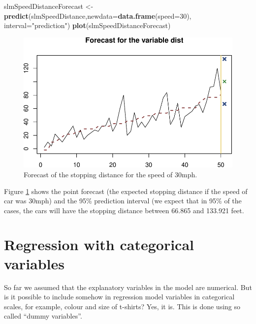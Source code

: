 \documentclass[
]{book}
\newenvironment{Shaded}{\begin{snugshade}}{\end{snugshade}}
\newcommand{\DataTypeTok}[1]{\textcolor[rgb]{0.13,0.29,0.53}{#1}}
\newcommand{\DecValTok}[1]{\textcolor[rgb]{0.00,0.00,0.81}{#1}}
\newcommand{\KeywordTok}[1]{\textcolor[rgb]{0.13,0.29,0.53}{\textbf{#1}}}
\newcommand{\NormalTok}[1]{#1}
\newcommand{\StringTok}[1]{\textcolor[rgb]{0.31,0.60,0.02}{#1}}
\theoremstyle{definition}
\theoremstyle{definition}
\theoremstyle{definition}
\theoremstyle{definition}
\theoremstyle{remark}
\begin{document}
\begin{Shaded}
\begin{Highlighting}[]
\NormalTok{slmSpeedDistanceForecast \textless{}{-}}\StringTok{ }\KeywordTok{predict}\NormalTok{(slmSpeedDistance,}\DataTypeTok{newdata=}\KeywordTok{data.frame}\NormalTok{(}\DataTypeTok{speed=}\DecValTok{30}\NormalTok{),}
                                    \DataTypeTok{interval=}\StringTok{"prediction"}\NormalTok{)}
\KeywordTok{plot}\NormalTok{(slmSpeedDistanceForecast)}
\end{Highlighting}
\end{Shaded}

\begin{figure}
\centering
\includegraphics{Svetunkov---Statistics-for-Business-Analytics_files/figure-latex/speedDistanceForecast-1.pdf}
\caption{\label{fig:speedDistanceForecast}Forecast of the stopping distance for the speed of 30mph.}
\end{figure}

Figure \ref{fig:speedDistanceForecast} shows the point forecast (the expected stopping distance if the speed of car was 30mph) and the 95\% prediction interval (we expect that in 95\% of the cases, the cars will have the stopping distance between 66.865 and 133.921 feet.

\hypertarget{dummyVariables}{%
\chapter{Regression with categorical variables}\label{dummyVariables}}

So far we assumed that the explanatory variables in the model are numerical. But is it possible to include somehow in regression model variables in categorical scales, for example, colour and size of t-shirts? Yes, it is. This is done using so called ``dummy variables''.
\end{document}
